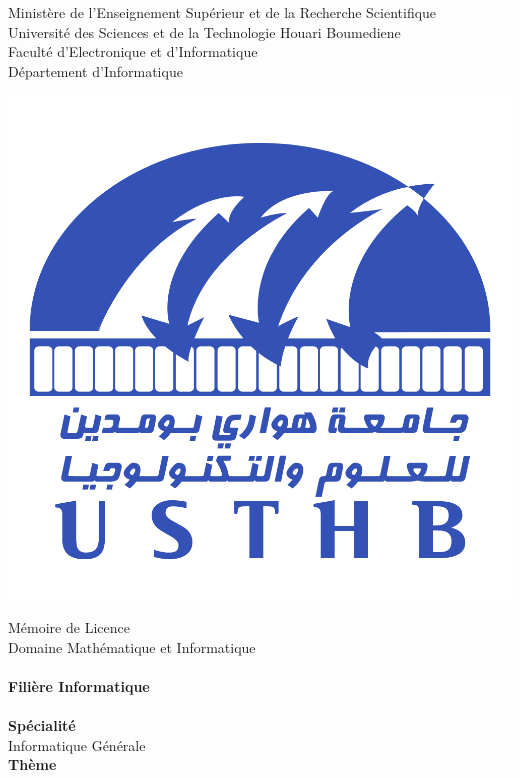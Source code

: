 \documentclass[a4paper,french,10pt,twoside]{report}
\begin{document}

\begin{sloppypar}
\fancyfoot{}
\thispagestyle{empty}
\begin{center}
\normalsize{Ministère de l’Enseignement Supérieur et de la Recherche Scientifique}\\
\normalsize{Université des Sciences et de la Technologie Houari Boumediene}\\
\normalsize{Faculté d’Electronique et d’Informatique}\\
\normalsize{Département d'Informatique}\\
\end{center}
\bigskip
\begin{center}
\includegraphics[scale=0.3]{pictures/USTHB.png}
\end{center}
\begin{center}
\huge{Mémoire de Licence}\bigskip
\\
\large{Domaine Mathématique et Informatique}\\
\textbf{}\\
\large{\textbf{Filière Informatique}}\\
\textbf{}\\
\large{\textbf{Spécialité}}\bigskip
\\
\large{Informatique Générale }\bigskip
\\
\large{\textbf{Thème}}\bigskip
\end{center}
\begin{center}
\setlength{\shadowsize}{2pt}


\end{center}
\end{sloppypar}
\end{document}
